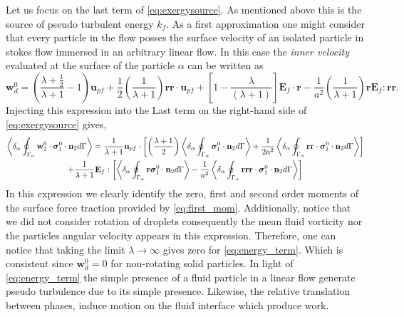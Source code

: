 Let us focus on the last term of \ref{eq:exergysource}.
As mentioned above this is the source of pseudo turbulent energy $k_f$. 
As a first approximation one might consider that every particle in the flow posses the surface velocity of an isolated particle in stokes flow immersed in an arbitrary linear flow.
In this case the \textit{inner velocity} evaluated at the surface of the particle $\alpha$ can be written as
\begin{equation*}
    \textbf{w}_d^0 
    = \left(\frac{\lambda + \frac{1}{2}}{\lambda +1} - 1\right)
    \textbf{u}_{pf} 
    + 
    \frac{1}{2}\left(\frac{1}{\lambda +1}\right)
    \textbf{rr} \cdot \textbf{u}_{pf} 
    + \left[1-\frac{\lambda}{(\lambda + 1)}\right]\textbf{E}_f\cdot\textbf{r}
    -\frac{1}{a^2}\left(\frac{1}{\lambda +1 } \right) \textbf{r} \textbf{E}_f:\textbf{rr}. 
\end{equation*}
Injecting this expression into the Last term on the right-hand side of \ref{eq:exergysource} gives, 
\begin{multline}
    \left<\delta_\alpha \oint_{\Gamma_\alpha} \textbf{w}_2^0 \cdot \bm{\sigma}_1^0\cdot\textbf{n}_2 d\Gamma\right>
    =  
    \frac{1}{\lambda+1}\textbf{u}_{p f} \cdot \left[
        \left(\frac{\lambda +1 }{2}\right)\left<\delta_\alpha \oint_{\Gamma_\alpha}  \bm{\sigma}_1^0\cdot\textbf{n}_2 d\Gamma\right>
        + \frac{1}{2a^2}
        \left<\delta_\alpha \oint_{\Gamma_\alpha} \textbf{rr}\cdot \bm{\sigma}_1^0\cdot\textbf{n}_2 d\Gamma\right>
    \right]
    \\
    + \frac{1}{\lambda + 1} \textbf{E}_{f} : \left[ 
         \left<\delta_\alpha \oint_{\Gamma_\alpha} \textbf{r} \bm{\sigma}_1^0\cdot\textbf{n}_2 d\Gamma\right>
         -\frac{1}{a^2} 
         \left<\delta_\alpha \oint_{\Gamma_\alpha}  \textbf{rrr} \cdot \bm{\sigma}_1^0\cdot\textbf{n}_2 d\Gamma\right>
         \right]
    \label{eq:energy_term}
\end{multline}
In this expression we clearly identify the zero, first and second order moments of the surface force traction provided by \ref{eq:first_mom}. 
Additionally, notice that we did not consider rotation of droplets consequently the mean fluid vorticity nor the particles angular velocity appears in this expression. 
Therefore, one can notice that taking the limit $\lambda \to \infty$ gives zero for \ref{eq:energy_term}. 
Which is consistent since $\textbf{w}_d^0 = 0$ for non-rotating solid particles. 
In light of \ref{eq:energy_term} the simple presence of a fluid particle in a linear flow generate pseudo turbulence due to its simple presence. 
Likewise, the relative translation between phases, induce motion on the fluid interface which produce work. 


